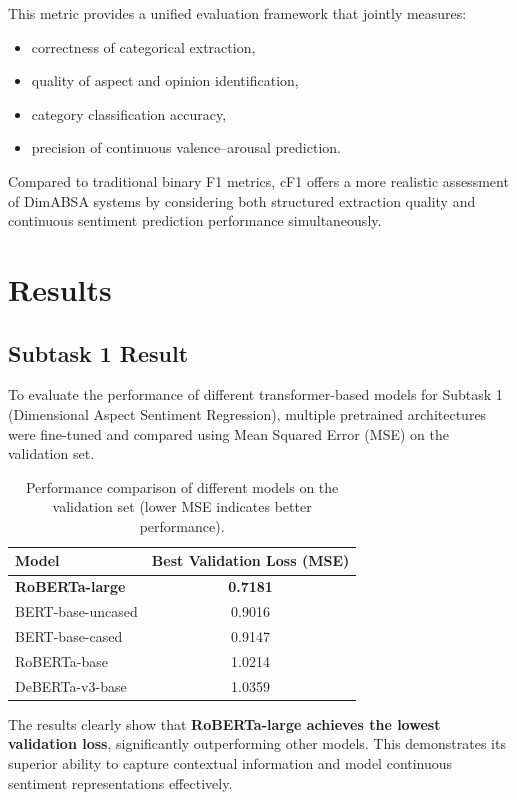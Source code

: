 \documentclass{article}
\begin{document}
This metric provides a unified evaluation framework that jointly measures:
\begin{itemize}
    \item correctness of categorical extraction,
    \item quality of aspect and opinion identification,
    \item category classification accuracy,
    \item precision of continuous valence–arousal prediction.
\end{itemize}

Compared to traditional binary F1 metrics, cF1 offers a more realistic assessment of DimABSA systems by considering both structured extraction quality and continuous sentiment prediction performance simultaneously.

\section{Results}
\label{sec:results}

\subsection{Subtask 1 Result}

To evaluate the performance of different transformer-based models for Subtask 1 (Dimensional Aspect Sentiment Regression), multiple pretrained architectures were fine-tuned and compared using Mean Squared Error (MSE) on the validation set.

\begin{table}[htbp]
\centering
\caption{Performance comparison of different models on the validation set (lower MSE indicates better performance).}
\label{tab:model_leaderboard}
\begin{tabular}{lc}
\hline
\textbf{Model} & \textbf{Best Validation Loss (MSE)} \\
\hline
\textbf{RoBERTa-large} & \textbf{0.7181} \\
BERT-base-uncased & 0.9016 \\
BERT-base-cased & 0.9147 \\
RoBERTa-base & 1.0214 \\
DeBERTa-v3-base & 1.0359 \\
\hline
\end{tabular}
\end{table}

The results clearly show that \textbf{RoBERTa-large achieves the lowest validation loss}, significantly outperforming other models. This demonstrates its superior ability to capture contextual information and model continuous sentiment representations effectively.
\end{document}
